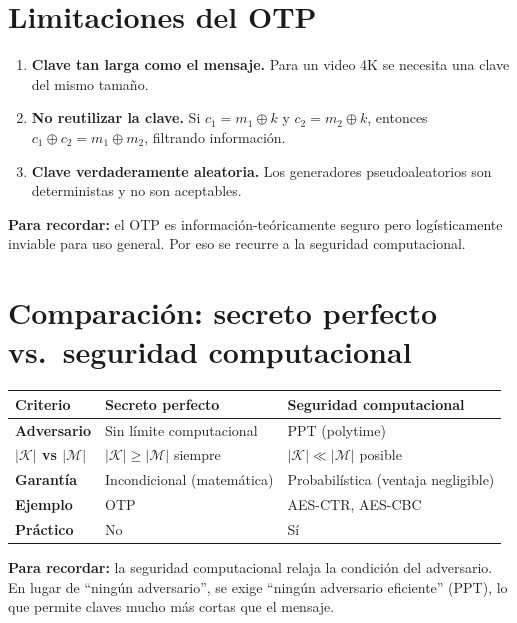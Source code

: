 \documentclass[11pt,a4paper]{article}
\begin{document}
\section{Limitaciones del OTP}

\begin{tcolorbox}[nostyle, title={Limitaciones prácticas del OTP}]
\begin{enumerate}[label=\textbf{\arabic*.}, leftmargin=2em, itemsep=4pt]
  \item \textbf{Clave tan larga como el mensaje.}
    Para un video 4K se necesita una clave del mismo tamaño.

  \item \textbf{No reutilizar la clave.}
    Si $c_1 = m_1 \oplus k$ y $c_2 = m_2 \oplus k$, entonces
    $c_1 \oplus c_2 = m_1 \oplus m_2$, filtrando información.

  \item \textbf{Clave verdaderamente aleatoria.}
    Los generadores pseudoaleatorios son deterministas y no son aceptables.
\end{enumerate}
\end{tcolorbox}

\begin{tcolorbox}[memostyle]
\textbf{Para recordar:} el OTP es información-teóricamente seguro pero logísticamente inviable para uso general. Por eso se recurre a la seguridad computacional.
\end{tcolorbox}

\section{Comparación: secreto perfecto vs.\ seguridad computacional}

\begin{center}
\renewcommand{\arraystretch}{1.4}
\begin{tabular}{>{\bfseries}lp{4.5cm}p{5cm}}
  \toprule
  \textbf{Criterio} & \textbf{Secreto perfecto} & \textbf{Seguridad computacional} \\
  \midrule
  Adversario      & Sin l\'imite computacional   & PPT (polytime) \\
  $|\mathcal{K}|$ vs $|\mathcal{M}|$ & $|\mathcal{K}| \geq |\mathcal{M}|$ siempre & $|\mathcal{K}| \ll |\mathcal{M}|$ posible \\
  Garant\'ia     & Incondicional (matem\'atica) & Probabil\'istica (ventaja negligible) \\
  Ejemplo         & OTP                        & AES-CTR, AES-CBC \\
  Pr\'actico      & No                         & S\'i \\
  \bottomrule
\end{tabular}
\end{center}

\medskip
\begin{tcolorbox}[memostyle]
\textbf{Para recordar:} la seguridad computacional relaja la condición del adversario. En lugar de ``ningún adversario'', se exige ``ningún adversario eficiente'' (PPT), lo que permite claves mucho más cortas que el mensaje.
\end{tcolorbox}
\end{document}
